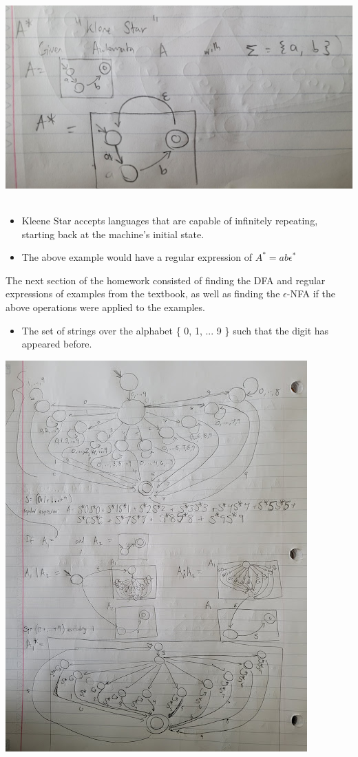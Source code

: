 \documentclass{article}
\theoremstyle{theorem}
\theoremstyle{definition}
\theoremstyle{remark}
\begin{document}
\includegraphics[width=15cm, height=8cm]{Report Images/HW11_3.jpg}
\begin{itemize}
    \item Kleene Star accepts languages that are capable of infinitely repeating, starting back at the machine's initial state.
    \item The above example would have a regular expression of $A^{*} = ab\epsilon^{*}$
\end{itemize}
The next section of the homework consisted of finding the DFA and regular expressions of examples from the textbook, as well as finding the $\epsilon$-NFA if the above operations were applied to the examples.
\begin{itemize}
    \item The set of strings over the alphabet \{ 0, 1, ... 9 \} such that the digit has appeared before.
\end{itemize}
\includegraphics{Report Images/HW11_4.jpg}
\end{document}
